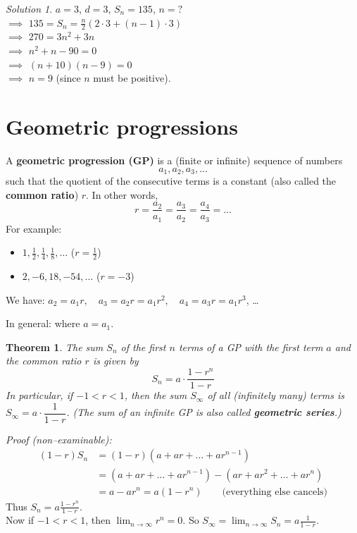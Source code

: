 \documentclass[
  english,
  12pt,
  oneside]{book}
\providecommand{\tightlist}{%
  \setlength{\itemsep}{0pt}\setlength{\parskip}{0pt}}
\newtheorem{theorem}{Theorem}[chapter]
\theoremstyle{definition}
\theoremstyle{definition}
\theoremstyle{definition}
\theoremstyle{definition}
\theoremstyle{remark}
\newtheorem*{solution}{Solution}
\begin{document}
\begin{solution}
\(a=3\), \(d=3\), \(S_n=135\), \(n=?\)\\
\(\implies\) \(135 = S_n = \frac{n}{2}(2\cdot 3+(n-1)\cdot 3)\)\\
\(\implies\) \(270 = 3n^2 + 3n\)\\
\(\implies\) \(n^2+n-90 = 0\)\\
\(\implies\) \((n+10)(n-9)=0\)\\
\(\implies\) \(n=9\) (since \(n\) must be positive).
\end{solution}

\section{Geometric progressions}\label{geometric-progressions}

A \textbf{geometric progression (GP)} is a (finite or infinite) sequence of numbers
\[a_1,a_2,a_3,\dots\]
such that the quotient of the consecutive terms is a constant (also called the \textbf{common ratio}) \(r\). In other words,
\[r = \frac{a_2}{a_1} = \frac{a_3}{a_2} = \frac{a_4}{a_3} = \dots\]
For example:

\begin{itemize}
\tightlist
\item
  \(1,\frac12,\frac14,\frac18,\dots\) \quad (\(r=\frac12\))
\item
  \(2,-6,18,-54,\dots\) \quad (\(r=-3\))
\end{itemize}

We have: \(a_2=a_1r\), ~ \(a_3=a_2r = a_1r^2\), ~ \(a_4=a_3r=a_1r^3\), \dots

In general:  where \(a=a_1\).

\begin{theorem}
The sum \(S_n\) of the first \(n\) terms of a GP with the first
term \(a\) and the common ratio \(r\) is given by
\[\boxed{S_n = a\cdot \frac{1-r^n}{1-r}}\]
In particular, if \(-1<r<1\), then the sum \(S_\infty\) of all (infinitely many) terms is \(S_\infty = a\cdot\dfrac{1}{1-r}\). (The sum of an infinite GP is also called \textbf{geometric series}.)
\end{theorem}

\emph{Proof (non--examinable):}
\begin{align*}
    (1-r)S_n &= (1-r)(a+ar+\dots+ar^{n-1})\\
     &= (a+ar+\dots+ar^{n-1}) - (ar + ar^2 +\dots +ar^n) \\
     &= a-ar^n = a(1-r^n) \qquad\text{(everything else cancels)}
\end{align*}
Thus \(S_n = a\frac{1-r^n}{1-r}\).\\
Now if \(-1<r<1\), then \(\lim_{n\to\infty}r^n=0\). So \(S_\infty=\lim_{n\to\infty}S_n = a\frac{1}{1-r}\).
\end{document}

